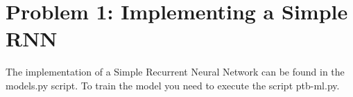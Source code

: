 \section{Problem 1: Implementing a Simple RNN}

The implementation of a Simple Recurrent Neural Network can be found in the models.py script. To train the model you need to execute the script ptb-ml.py.




